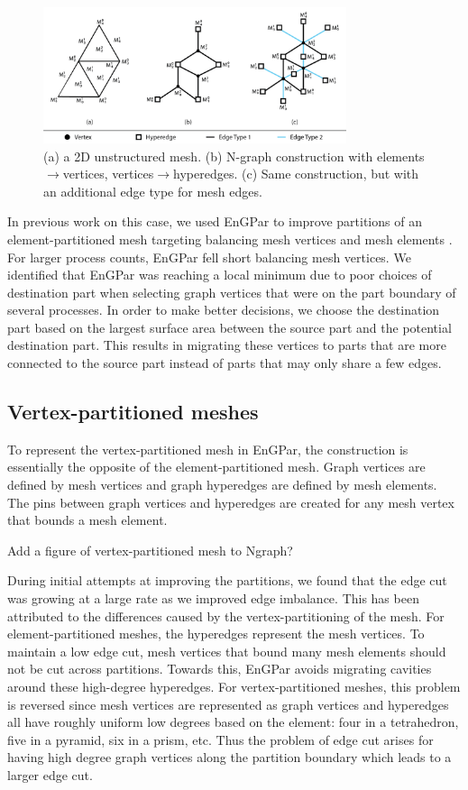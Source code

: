 \documentclass[conference]{IEEEtran}
\begin{document}
\begin{figure}[!ht]
  \centering
  \includegraphics[width=3.5in]{../figures/exampleMesh2Graph.png}
  \caption{(a) a 2D unstructured mesh. (b) N-graph construction with elements$\rightarrow$vertices, vertices$\rightarrow$hyperedges. (c) Same construction, but with an additional edge type for mesh edges.}
  \label{fig:mesh2graph}
\end{figure}

In previous work on this case, we used EnGPar to improve partitions of an
element-partitioned mesh targeting balancing mesh vertices and mesh elements \cite{engparSC17}.
For larger process counts, EnGPar fell short balancing mesh vertices.
We identified that EnGPar was reaching a local minimum due to poor choices of destination part
when selecting graph vertices that were on the part boundary of several processes. In order
to make better decisions, we choose the destination part based on the largest surface area
between the source part and the potential destination part. This results in migrating these
vertices to parts that are more connected to the source part instead of parts that may only
share a few edges.

\subsection{Vertex-partitioned meshes}

To represent the vertex-partitioned mesh in EnGPar, the construction
is essentially the opposite of the element-partitioned mesh. Graph
vertices are defined by mesh vertices and graph hyperedges are defined
by mesh elements. The pins between graph vertices and hyperedges are
created for any mesh vertex that bounds a mesh element.

{\color{red} Add a figure of vertex-partitioned mesh to Ngraph?}

During initial attempts at improving the partitions, we found that the edge cut was growing
at a large rate as we improved edge imbalance. This has been attributed to the differences
caused by the vertex-partitioning of the mesh. For element-partitioned meshes, the hyperedges
represent the mesh vertices. To maintain a low edge cut, mesh vertices that bound many mesh
elements should not be cut across partitions. Towards this, EnGPar avoids migrating cavities
around these high-degree hyperedges. For vertex-partitioned meshes, this problem is reversed
since mesh vertices are represented as graph vertices and hyperedges all have roughly uniform
low degrees based on the element: four in a tetrahedron, five in a pyramid, six in a prism, etc.
Thus the problem of edge cut arises for having high degree graph vertices along the partition
boundary which leads to a larger edge cut.
\end{document}
